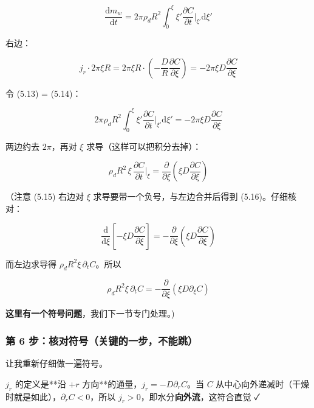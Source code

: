 \begin{equation}
\frac{\mathrm{d} m_w}{\mathrm{d} t}=2\pi\rho_dR^2\int_0^{\xi}\xi'\frac{\partial C}{\partial t}\Big|_{\xi'}\mathrm{d}\xi'\tag{5.13}
\end{equation}


右边：


\begin{equation}
j_r\cdot2\pi\xi R=2\pi\xi R\cdot\left(-\frac{D}{R}\frac{\partial C}{\partial\xi}\right)=-2\pi\xi D\frac{\partial C}{\partial\xi}\tag{5.14}
\end{equation}


令 (5.13) = (5.14)：


\begin{equation}
2\pi\rho_dR^2\int_0^{\xi}\xi'\frac{\partial C}{\partial t}\Big|_{\xi'}\mathrm{d}\xi'=-2\pi\xi D\frac{\partial C}{\partial\xi}\tag{5.15}
\end{equation}


两边约去 $2\pi$，再对 $\xi$ 求导（这样可以把积分去掉）：


\begin{equation}
\rho_dR^2\,\xi\,\frac{\partial C}{\partial t}\Big|_{\xi}=\frac{\partial}{\partial\xi}\left(\xi D\frac{\partial C}{\partial\xi}\right)\tag{5.16}
\end{equation}


（注意 (5.15) 右边对 $\xi$ 求导要带一个负号，与左边合并后得到 (5.16)。仔细核对：

\begin{equation*}
\frac{\mathrm{d}}{\mathrm{d}\xi}\left[-\xi D\frac{\partial C}{\partial\xi}\right]=-\frac{\partial}{\partial\xi}\left(\xi D\frac{\partial C}{\partial\xi}\right)
\end{equation*}

而左边求导得 $\rho_dR^2\xi\,\partial_tC$。所以

\begin{equation*}
\rho_dR^2\xi\,\partial_tC=-\frac{\partial}{\partial\xi}\left(\xi D\partial_\xi C\right)
\end{equation*}

\textbf{这里有一个符号问题}，我们下一节专门处理。)


\subsubsection{第 6 步：核对符号（关键的一步，不能跳）}


让我重新仔细做一遍符号。


$j_r$ 的定义是**沿 $+r$ 方向**的通量，$j_r=-D\partial_rC$。当 $C$ 从中心向外递减时（干燥时就是如此），$\partial_rC<0$，所以 $j_r>0$，即水分\textbf{向外流}，这符合直觉 ✓


